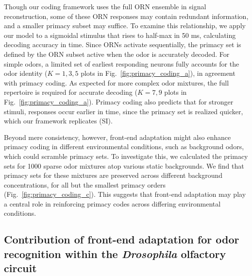 \documentclass[9pt,twocolumn,twoside,lineno]{pnas-new}
\begin{document}
Though our coding framework uses the full ORN ensemble in signal reconstruction, some of these ORN responses may contain redundant information, and a smaller primacy subset may suffice. To examine this relationship, we apply our model to a sigmoidal stimulus that rises to half-max in 50 ms, calculating decoding accuracy in time. Since ORNs activate sequentially, the primacy set is defined by the ORN subset active when the odor is accurately decoded. For simple odors, a limited set of earliest responding neurons fully accounts for the odor identity ($K=1, 3, 5$ plots in Fig.~\ref{fig:primacy_coding_a}), in agreement with primacy coding. %
As expected for more complex odor mixtures, the full repertoire is required for accurate decoding ($K=7, 9$ plots in Fig.~\ref{fig:primacy_coding_a}). Primacy coding also predicts that for stronger stimuli, responses occur earlier in time, since the primacy set is realized quicker, which our framework replicates (SI).

Beyond mere consistency, however, front-end adaptation might also enhance primacy coding in different environmental conditions, such as background odors, which could scramble primacy sets. %
To investigate this, we calculated the primacy sets for 1000 sparse odor mixtures atop various static backgrounds. We find that primacy sets for these mixtures are preserved across different background concentrations, for all but the smallest primacy orders (Fig.~\ref{fig:primacy_coding_c}). This suggests that front-end adaptation may play a central role in reinforcing primacy codes across differing environmental conditions. 


\subsection*{Contribution of front-end adaptation for odor recognition within the \textit{Drosophila} olfactory circuit}
\end{document}
